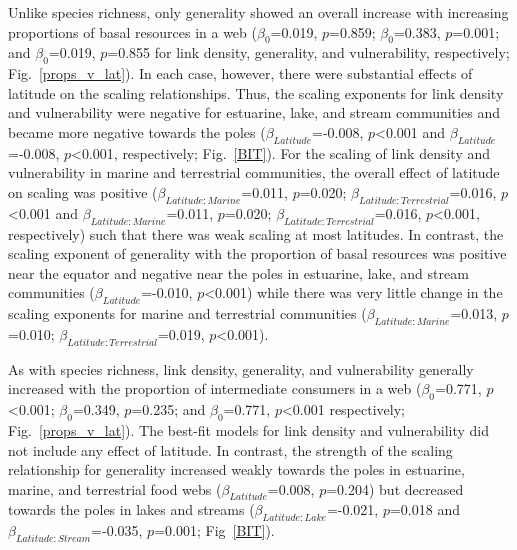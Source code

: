 \documentclass[12pt]{article}
\begin{document}
    Unlike species richness, only generality showed an overall increase with
    increasing proportions of basal resources in a web ($\beta_0$=0.019,
    $p$=0.859; $\beta_0$=0.383, $p$=0.001; and $\beta_0$=0.019, $p$=0.855 for
    link density, generality, and vulnerability, respectively;
    Fig.~\ref{props_v_lat}). In each case, however, there were substantial
    effects of latitude on the scaling relationships. Thus, the scaling
    exponents for link density and vulnerability were negative for estuarine,
    lake, and stream communities and became more negative towards the poles
    ($\beta_{Latitude}$=-0.008, $p$\textless0.001 and $\beta_{Latitude}$=-0.008,
    $p$\textless0.001, respectively; Fig.~\ref{BIT}). For the scaling of link
    density and vulnerability in marine and terrestrial communities, the overall
    effect of latitude on scaling was positive ($\beta_{Latitude:Marine}$=0.011,
    $p$=0.020; $\beta_{Latitude:Terrestrial}$=0.016, $p$\textless0.001 and
    $\beta_{Latitude:Marine}$=0.011, $p$=0.020;
    $\beta_{Latitude:Terrestrial}$=0.016, $p$\textless0.001, respectively) such
    that there was weak scaling at most latitudes. In contrast, the scaling
    exponent of generality with the proportion of basal resources was positive
    near the equator and negative near the poles in estuarine, lake, and stream
    communities ($\beta_{Latitude}$=-0.010, $p$\textless0.001) while there was
    very little change in the scaling exponents for marine and terrestrial
    communities ($\beta_{Latitude:Marine}$=0.013, $p$=0.010;
    $\beta_{Latitude:Terrestrial}$=0.019, $p$\textless0.001).


    As with species richness, link density, generality, and vulnerability
    generally increased with the proportion of intermediate consumers in a web
    ($\beta_0$=0.771, $p$\textless0.001; $\beta_0$=0.349, $p$=0.235; and
    $\beta_0$=0.771, $p$\textless0.001 respectively; Fig.~\ref{props_v_lat}). 
    The best-fit models for link density and vulnerability did not include
    any effect of latitude. In contrast, the strength of the scaling relationship
    for generality increased weakly towards the poles in estuarine, marine, and
    terrestrial food webs ($\beta_{Latitude}$=0.008, $p$=0.204) but decreased 
    towards the poles in lakes and streams ($\beta_{Latitude:Lake}$=-0.021, $p$=0.018
    and $\beta_{Latitude:Stream}$=-0.035, $p$=0.001; Fig~\ref{BIT}).
\end{document}
